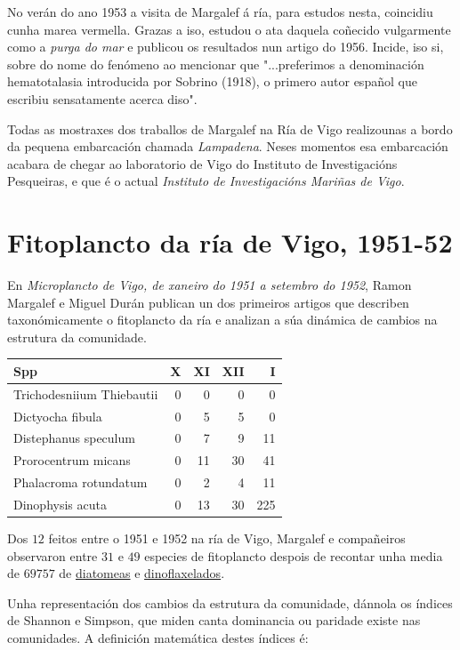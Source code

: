 \documentclass{article}
\begin{document}
No verán do ano 1953 a visita de Margalef á ría, para estudos nesta, coincidiu cunha marea vermella. Grazas a iso, estudou o ata daquela coñecido vulgarmente como a \textit{purga do mar} e publicou os resultados nun artigo do 1956. Incide, iso si, sobre do nome do fenómeno ao mencionar que "...preferimos a denominación hematotalasia introducida por Sobrino (1918), o primero autor español que escribiu sensatamente acerca diso".

Todas as mostraxes dos traballos de Margalef na Ría de Vigo realizounas a bordo da pequena embarcación chamada \textit{Lampadena}. Neses momentos esa embarcación acabara de chegar ao laboratorio de Vigo do Instituto de Investigacións Pesqueiras, e que é o actual \textit{Instituto de Investigacións Mariñas de Vigo}.


\section{Fitoplancto da ría de Vigo, 1951-52}

En \textit{Microplancto de Vigo, de xaneiro do 1951 a setembro do 1952}, Ramon Margalef e Miguel Durán publican un dos primeiros artigos que describen taxonómicamente o fitoplancto da ría e analizan a súa dinámica de cambios na estrutura da comunidade. 

\begin{tabular}{lrrrr}
  \hline
Spp & X & XI & XII & I \\ 
  \hline
Trichodesniium Thiebautii & 0 & 0 & 0 & 0 \\ 
  Dictyocha fibula & 0 & 5 & 5 & 0 \\ 
  Distephanus speculum & 0 & 7 & 9 & 11 \\ 
  Prorocentrum micans & 0 & 11 & 30 & 41 \\ 
  Phalacroma  rotundatum & 0 & 2 & 4 & 11 \\ 
  Dinophysis acuta & 0 & 13 & 30 & 225 \\ 
   \hline
\end{tabular}




Dos $12$ feitos entre o 1951 e 1952 na ría de Vigo, Margalef e compañeiros observaron entre $31$ e $49$ especies de fitoplancto despois de recontar unha media de $69757$ de \href{https://gl.wikipedia.org/wiki/Diatomeas}{diatomeas} e \href{https://gl.wikipedia.org/wiki/Dinoflaxelados}{dinoflaxelados}.
 
Unha representación dos cambios da estrutura da comunidade, dánnola os índices de Shannon e Simpson, que miden canta dominancia ou paridade existe nas comunidades. A definición matemática destes índices é:
\end{document}
